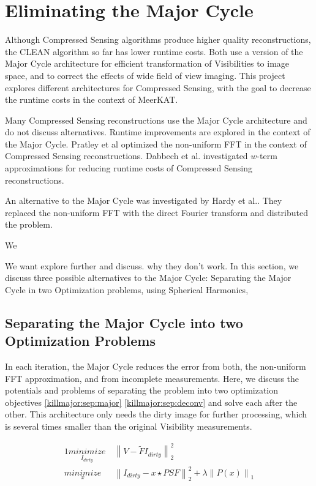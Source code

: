 \section{Eliminating the Major Cycle}\label{killmajor}
Although Compressed Sensing algorithms produce higher quality reconstructions, the CLEAN algorithm so far has lower runtime costs. Both use a version of the Major Cycle architecture for efficient transformation of Visibilities to image space, and to correct the effects of wide field of view imaging. This project explores different architectures for Compressed Sensing, with the goal to decrease the runtime costs in the context of MeerKAT.

Many Compressed Sensing reconstructions use the Major Cycle architecture\cite{girard2015sparse, dabbech2018cygnus, mcewen2011compressed, pratley2018fast}  and do not discuss alternatives. Runtime improvements are explored in the context of the Major Cycle. Pratley et al\cite{pratley2017robust} optimized the non-uniform FFT in the context of Compressed Sensing reconstructions. Dabbech et al.\cite{dabbech2017wEffect} investigated $w$-term approximations for reducing runtime costs of Compressed Sensing reconstructions. 

An alternative to the Major Cycle was investigated by Hardy et al.\cite{hardy2013direct}. They replaced the non-uniform FFT with the direct Fourier transform and distributed the problem.

We

We want explore further and discuss. why they don't work.
In this section, we discuss three possible alternatives to the Major Cycle: Separating the Major Cycle in two Optimization problems, using Spherical Harmonics,



\subsection{Separating the Major Cycle into two Optimization Problems}
In each iteration, the Major Cycle reduces the error from both, the non-uniform FFT approximation, and from incomplete measurements. Here, we discuss the potentials and problems of separating the problem into two optimization objectives \eqref{killmajor:sep:major} \eqref{killmajor:sep:deconv} and solve each after the other. This architecture only needs the dirty image for further processing, which is several times smaller than the original Visibility measurements.

\begin{alignat}{1}
\underset{I_{dirty}}{minimize} \:& \left \|  V - \tilde{F}I_{dirty} \right \|_2^2\label{killmajor:sep:major}\\
\underset{x}{minimize} \:& \left \| I_{dirty} - x \star PSF \right \|_2^2 + \lambda \left \| P(x) \right \|_1 \label{killmajor:sep:deconv}
\end{alignat}

